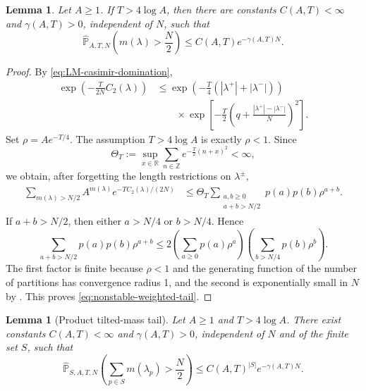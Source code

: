 \documentclass[11pt,a4paper,reqno]{amsart}
\newtheorem{lemma}[theorem]{Lemma}
\theoremstyle{definition}
\theoremstyle{remark}
\newcommand\Z{{\mathbb{Z}}}
\newcommand\Pbb{{\mathbb{P}}}
\begin{document}
\begin{lemma}\label{lem:nonstable-weighted-tail}
Let $A\geq1$.  If $T>4\log A$, then there are constants $C(A,T)<\infty$ and $\gamma(A,T)>0$, independent of $N$, such that
\begin{equation}\label{eq:nonstable-weighted-tail}
\widehat\Pbb_{A,T,N}\left(m(\lambda)>\frac{N}{2}\right)\leq C(A,T)e^{-\gamma(A,T)N}.
\end{equation}
\end{lemma}

\begin{proof}
By \eqref{eq:LM-casimir-domination},
\[
\begin{aligned}
\exp\left(-\frac{T}{2N}C_2(\lambda)\right)
&\leq
\exp\left(-\frac{T}{4}(|\lambda^+|+|\lambda^-|)\right)\\
&\qquad\times
\exp\left[-\frac{T}{2}\left(q+\frac{|\lambda^+|-|\lambda^-|}{N}\right)^2\right].
\end{aligned}
\]
Set $\rho=Ae^{-T/4}$.  The assumption $T>4\log A$ is exactly $\rho<1$.  Since
\[
\Theta_T:=\sup_{x\in\mathbb R}\sum_{n\in\Z}e^{-\frac{T}{2}(n+x)^2}<\infty,
\]
we obtain, after forgetting the length restrictions on $\lambda^\pm$,
\begin{align*}
\sum_{m(\lambda)>N/2}A^{m(\lambda)}e^{-TC_2(\lambda)/(2N)}&\leq \Theta_T \sum_{\substack{a,b\geq0\\ a+b>N/2}}p(a)p(b)\rho^{a+b}.
\end{align*}
If $a+b>N/2$, then either $a>N/4$ or $b>N/4$.  Hence
\[
\sum_{a+b>N/2}p(a)p(b)\rho^{a+b}\leq 2\left(\sum_{a\geq0}p(a)\rho^a\right)\left(\sum_{b>N/4}p(b)\rho^b\right).
\]
The first factor is finite because $\rho<1$ and the generating function of the number of partitions has convergence radius 1, and the second is exponentially small in $N$ by \cite[Lemma~2.4]{LemMai25}. This proves \eqref{eq:nonstable-weighted-tail}.
\end{proof}

\begin{lemma}[Product tilted-mass tail]\label{lem:product-tilted-mass-tail}
Let $A\ge1$ and $T>4\log A$. There exist constants $C(A,T)<\infty$ and $\gamma(A,T)>0$, independent of $N$ and of the finite set $S$, such that
\begin{equation}\label{eq:product-tilted-mass-tail}
\widehat\Pbb_{S,A,T,N}\left(\sum_{p\in S}m(\lambda_p)>\frac N2\right)
\le C(A,T)^{|S|}e^{-\gamma(A,T)N}.
\end{equation}
\end{lemma}
\end{document}
